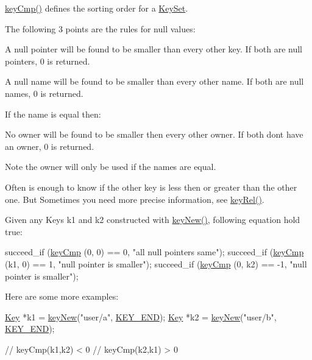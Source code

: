 \hyperlink{group__keytest_gaf6e66e12fe04d535a5d1c8218ced803e}{key\+Cmp()} defines the sorting order for a \hyperlink{classkdb_1_1KeySet}{Key\+Set}.

The following 3 points are the rules for null values\+:


\begin{DoxyItemize}
\item A null pointer will be found to be smaller than every other key. If both are null pointers, 0 is returned.
\item A null name will be found to be smaller than every other name. If both are null names, 0 is returned.
\end{DoxyItemize}

If the name is equal then\+:


\begin{DoxyItemize}
\item No owner will be found to be smaller then every other owner. If both don\textquotesingle{}t have an owner, 0 is returned.
\end{DoxyItemize}

\begin{DoxyNote}{Note}
the owner will only be used if the names are equal.
\end{DoxyNote}
Often is enough to know if the other key is less then or greater than the other one. But Sometimes you need more precise information, see \hyperlink{group__keytest_ga6bb0f95ac34ce9c42d61bb35a76139d0}{key\+Rel()}.

Given any Keys k1 and k2 constructed with \hyperlink{group__key_gad23c65b44bf48d773759e1f9a4d43b89}{key\+New()}, following equation hold true\+:


\begin{DoxyCodeInclude}
        succeed\_if (\hyperlink{group__keytest_gaf6e66e12fe04d535a5d1c8218ced803e}{keyCmp} (0, 0) == 0, \textcolor{stringliteral}{"all null pointers same"});
        succeed\_if (\hyperlink{group__keytest_gaf6e66e12fe04d535a5d1c8218ced803e}{keyCmp} (k1, 0) == 1, \textcolor{stringliteral}{"null pointer is smaller"});
        succeed\_if (\hyperlink{group__keytest_gaf6e66e12fe04d535a5d1c8218ced803e}{keyCmp} (0, k2) == -1, \textcolor{stringliteral}{"null pointer is smaller"});
\end{DoxyCodeInclude}
 Here are some more examples\+: 
\begin{DoxyCode}
\hyperlink{classkdb_1_1Key_a5679f5cae63caddd64a60388b9cc77fa}{Key} *k1 = \hyperlink{group__key_gad23c65b44bf48d773759e1f9a4d43b89}{keyNew}(\textcolor{stringliteral}{"user/a"}, \hyperlink{group__key_gga91fb3178848bd682000958089abbaf40aa8adb6fcb92dec58fb19410eacfdd403}{KEY\_END});
\hyperlink{classkdb_1_1Key_a5679f5cae63caddd64a60388b9cc77fa}{Key} *k2 = \hyperlink{group__key_gad23c65b44bf48d773759e1f9a4d43b89}{keyNew}(\textcolor{stringliteral}{"user/b"}, \hyperlink{group__key_gga91fb3178848bd682000958089abbaf40aa8adb6fcb92dec58fb19410eacfdd403}{KEY\_END});

\textcolor{comment}{// keyCmp(k1,k2) < 0}
\textcolor{comment}{// keyCmp(k2,k1) > 0}
\end{DoxyCode}


